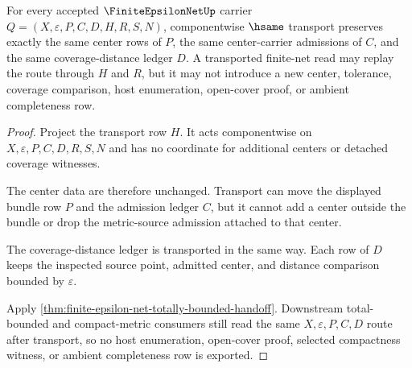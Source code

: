 \begin{theorem}
\label{thm:finite-epsilon-net-obligation-center-transport}
For every accepted $\FiniteEpsilonNetUp$ carrier $Q=(X,\varepsilon,P,C,D,H,R,S,N)$, componentwise $\hsame$ transport preserves exactly the same center rows of $P$, the same center-carrier admissions of $C$, and the same coverage-distance ledger $D$. A transported finite-net read may replay the route through $H$ and $R$, but it may not introduce a new center, tolerance, coverage comparison, host enumeration, open-cover proof, or ambient completeness row.
\end{theorem}
\begin{proof}
Project the transport row $H$. It acts componentwise on $X,\varepsilon,P,C,D,R,S,N$ and has no coordinate for additional centers or detached coverage witnesses.

The center data are therefore unchanged. Transport can move the displayed bundle row $P$ and the admission ledger $C$, but it cannot add a center outside the bundle or drop the metric-source admission attached to that center.

The coverage-distance ledger is transported in the same way. Each row of $D$ keeps the inspected source point, admitted center, and distance comparison bounded by $\varepsilon$.

Apply \autoref{thm:finite-epsilon-net-totally-bounded-handoff}. Downstream total-bounded and compact-metric consumers still read the same $X,\varepsilon,P,C,D$ route after transport, so no host enumeration, open-cover proof, selected compactness witness, or ambient completeness row is exported.
\end{proof}


